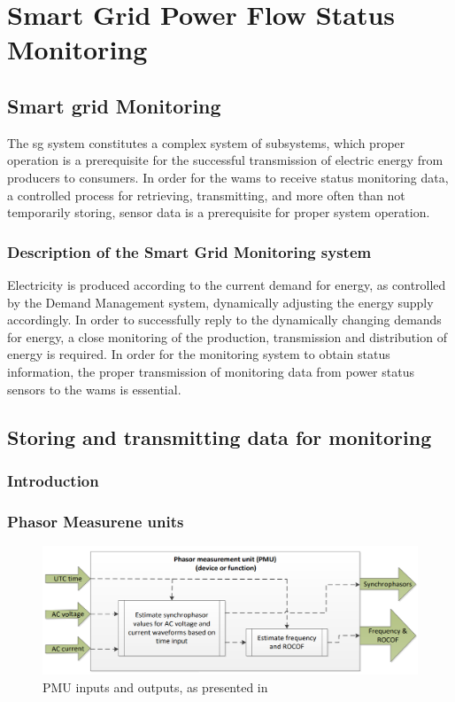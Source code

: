 \chapter{Smart Grid Power Flow Status Monitoring}



\section{Smart grid Monitoring}
The \acrlong{sg} system constitutes a complex system of subsystems, which proper operation is a prerequisite for the successful transmission of electric energy from producers to consumers. 
In order for the \acrshort{wams} to receive status monitoring data, a controlled process for retrieving, transmitting, and more often than not temporarily storing, sensor data is a prerequisite for proper system operation.



\subsection{Description of the Smart Grid  Monitoring system}
Electricity is produced according to the current demand for energy, as controlled by the Demand Management system, dynamically adjusting the energy supply accordingly. In order to successfully reply to the dynamically changing demands for energy, a close monitoring of the production, transmission and distribution of energy is required. In order for the monitoring system to obtain status information, the proper transmission of monitoring data from power status sensors to the   \acrshort{wams}  is essential.


\section{Storing and transmitting data for monitoring}


\subsection{Introduction}




\subsection{Phasor Measurene units}


\begin{figure}%
\includegraphics[width=\linewidth]{figures/PMU-in-out.png}
\caption[PMU inputs and outputs]{PMU inputs and outputs, as presented in \Cite[p.12]{iec2018measuring}
}
\label{fig:PMU-in-out}
\end{figure}

